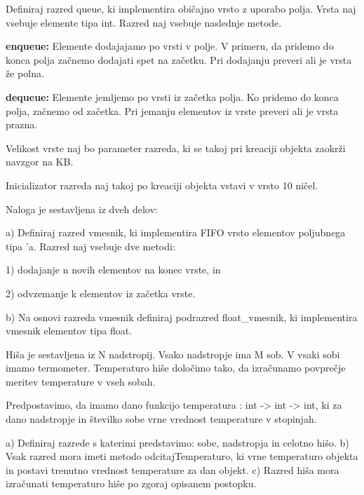 \begin{ex}
  Definiraj razred queue, ki implementira obi\v cajno vrsto z uporabo
  polja. Vrsta naj vsebuje elemente tipa int. Razred naj vsebuje
  naslednje metode.

  \textbf{enqueue:} Elemente dodajajamo po vrsti v polje. V primeru,
  da pridemo do konca polja za\v cnemo dodajati spet na za\v
  cetku. Pri dodajanju preveri ali je vrsta \v ze polna.
                 
  \textbf{dequeue:} Elemente jemljemo po vrsti iz za\v cetka polja. Ko
  pridemo do konca polja, za\v cnemo od za\v cetka. Pri jemanju
  elementov iz vrste preveri ali je vrsta prazna.

  Velikost vrste naj bo parameter razreda, ki se takoj pri kreaciji
  objekta zaokr\v zi navzgor na KB.

  Inicializator razreda naj takoj po kreaciji objekta vstavi v vrsto
  10 ni\v cel.


\end{ex}
\begin{ex}
Naloga je sestavljena iz dveh delov:

  a) Definiraj razred vmesnik, ki implementira FIFO vrsto elementov
  poljubnega tipa 'a. Razred naj vsebuje dve metodi:

  1) dodajanje n novih elementov na konec vrste, in
       
  2) odvzemanje k elementov iz za\v cetka vrste.

  b) Na osnovi razreda vmesnik definiraj podrazred float\_vmesnik, ki
  implementira vmesnik elementov tipa float.



\end{ex} 
\begin{ex}
Hi\v sa je sestavljena iz N nadstropij. Vsako nadstropje ima M sob. V vsaki sobi imamo termometer. Temperaturo hi\v se dolo\v cimo tako, da izra\v cunamo povpre\v cje meritev temperature v vseh sobah. 

Predpostavimo, da imamo dano funkcijo temperatura : int -> int -> int, ki za dano nadstropje in \v stevilko sobe vrne vrednost temperature v stopinjah. 

a) Definiraj razrede s katerimi predstavimo: sobe, nadstropja in celotno hi\v so.
b) Vsak razred mora imeti metodo odcitajTemperaturo, ki vrne temperaturo objekta in  postavi trenutno vrednost temperature za dan objekt.
c) Razred hi\v sa mora izra\v cunati temperaturo hi\v se po zgoraj opisanem postopku.


\end{ex} 
